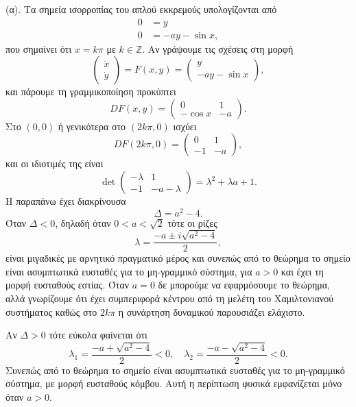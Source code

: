 \begin{solution}
    (α). Τα σημεία ισορροπίας του απλού εκκρεμούς υπολογίζονται από
    \begin{align*}
        0 &= y \\
        0 &= -a y - \sin{x},
    \end{align*}
    που σημαίνει ότι \( x = k\pi \) με \( k \in \mathbb{Z} \). Αν γράψουμε τις
    σχέσεις στη μορφή
    \[
        \begin{pmatrix}
            \dot{x} \\
            \dot{y}
        \end{pmatrix} = F(x, y) =
        \begin{pmatrix}
            y \\
            -a y - \sin{x}
        \end{pmatrix},
    \]
    και πάρουμε τη γραμμικοποίηση προκύπτει
    \[
        DF(x, y) =
        \begin{pmatrix}
            0 & 1 \\
            -\cos{x} & -a
        \end{pmatrix}.
    \]
    Στο \( (0, 0) \) ή γενικότερα στο \( (2k\pi, 0) \) ισχύει
    \[
        DF(2k\pi, 0) =
        \begin{pmatrix}
            0 & 1 \\
            -1 & -a
        \end{pmatrix},
    \]
    και οι ιδιοτιμές της είναι
    \[
        \det
        \begin{pmatrix}
            -\lambda & 1 \\
            -1 & -a - \lambda
        \end{pmatrix}
        = \lambda^2 + \lambda a + 1.
    \]
    Η παραπάνω έχει διακρίνουσα
    \[
        \Delta = a^2 - 4.
    \]
    Όταν \( \Delta < 0 \), δηλαδή όταν \( 0 < a < \sqrt{2} \) τότε οι ρίζες
    \[
        \lambda = \frac{-a \pm i \sqrt{a^2 - 4}}{2},
    \]
    είναι μιγαδικές με αρνητικό πραγματικό μέρος και συνεπώς από το θεώρημα
     το σημείο είναι ασυμπτωτικά ευσταθές για το μη-γραμμικό
    σύστημα, για \( a > 0 \) και έχει τη μορφή ευσταθούς εστίας. Όταν \( a = 0 \)
    δε μπορούμε να εφαρμόσουμε το θεώρημα, αλλά γνωρίζουμε ότι έχει συμπεριφορά
    κέντρου από τη μελέτη του Χαμιλτονιανού συστήματος καθώς στο \( 2k\pi \) η
    συνάρτηση δυναμικού παρουσιάζει ελάχιστο.

    Αν \( \Delta > 0 \) τότε εύκολα φαίνεται ότι
    \[
        \lambda_1 = \frac{-a + \sqrt{a^2 - 4}}{2} < 0, \quad
        \lambda_2 = \frac{-a - \sqrt{a^2 - 4}}{2} < 0.
    \]
    Συνεπώς από το θεώρημα  το σημείο είναι
    ασυμπτωτικά ευσταθές για το μη-γραμμικό σύστημα, με μορφή ευσταθούς κόμβου.
    Αυτή η περίπτωση φυσικά εμφανίζεται μόνο όταν \( a > 0 \).


\end{solution}
